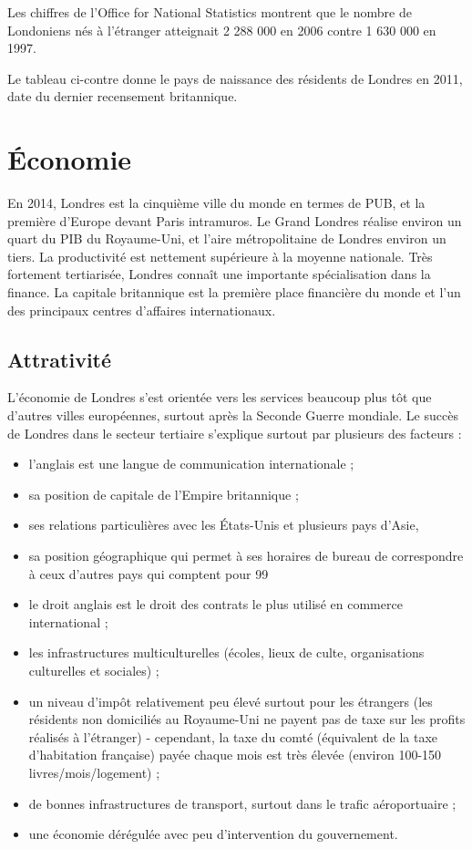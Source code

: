 \documentclass{article}
\begin{document}
Les chiffres de l'Office for National Statistics montrent que le nombre de Londoniens nés à l'étranger atteignait 2 288 000 en 2006 contre 1 630 000 en 1997.

Le tableau ci-contre donne le pays de naissance des résidents de Londres en 2011, date du dernier recensement britannique.

\newpage
\section{Économie}
En 2014, Londres est la cinquième ville du monde en termes de PUB, et la première d'Europe devant Paris intramuros. Le Grand Londres réalise environ un quart du PIB du Royaume-Uni, et l'aire métropolitaine de Londres environ un tiers. La productivité est nettement supérieure à la moyenne nationale. Très fortement tertiarisée, Londres connaît une importante spécialisation dans la finance. La capitale britannique est la première place financière du monde et l'un des principaux centres d'affaires internationaux. 

\subsection{Attrativité}
L'économie de Londres s'est orientée vers les services beaucoup plus tôt que d'autres villes européennes, surtout après la Seconde Guerre mondiale. Le succès de Londres dans le secteur tertiaire s'explique surtout par plusieurs des facteurs :
\begin{itemize}
    \item l'anglais est une langue de communication internationale ;
    \item sa position de capitale de l'Empire britannique ;
    \item ses relations particulières avec les États-Unis et plusieurs pays d'Asie,
    \item sa position géographique qui permet à ses horaires de bureau de correspondre à ceux d'autres pays qui comptent pour 99 %
    \item le droit anglais est le droit des contrats le plus utilisé en commerce international ;
    \item les infrastructures multiculturelles (écoles, lieux de culte, organisations culturelles et sociales) ;
    \item un niveau d'impôt relativement peu élevé surtout pour les étrangers (les résidents non domiciliés au Royaume-Uni ne payent pas de taxe sur les profits réalisés à l'étranger) - cependant, la taxe du comté (équivalent de la taxe d'habitation française) payée chaque mois est très élevée (environ 100-150 livres/mois/logement) ;
    \item de bonnes infrastructures de transport, surtout dans le trafic aéroportuaire ;
    \item une économie dérégulée avec peu d'intervention du gouvernement.
\end{itemize}
\end{document}
